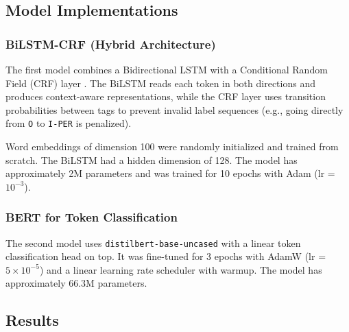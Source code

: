\documentclass[12pt,a4paper]{article}
\begin{document}
\subsection{Model Implementations}

\subsubsection{BiLSTM-CRF (Hybrid Architecture)}

The first model combines a Bidirectional LSTM with a Conditional Random Field
(CRF) layer \cite{lafferty2001crf,lample2016bilstmcrf}. The BiLSTM reads each
token in both directions and produces context-aware representations, while the
CRF layer uses transition probabilities between tags to prevent invalid label
sequences (e.g., going directly from \texttt{O} to \texttt{I-PER} is penalized).

Word embeddings of dimension 100 were randomly initialized and trained from
scratch. The BiLSTM had a hidden dimension of 128. The model has approximately
2M parameters and was trained for 10 epochs with Adam (lr = $10^{-3}$).

\subsubsection{BERT for Token Classification}

The second model uses \texttt{distilbert-base-uncased} \cite{devlin2019bert}
with a linear token classification head on top. It was fine-tuned for 3 epochs
with AdamW (lr = $5 \times 10^{-5}$) and a linear learning rate scheduler with
warmup. The model has approximately 66.3M parameters.

\subsection{Results}
\end{document}
